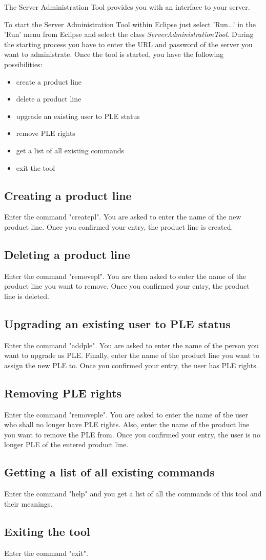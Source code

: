 The Server Administration Tool provides you with an interface to your server. \par
To start the Server Administration Tool within Eclipse just select 'Run...' in the
'Run' menu from Eclipse and select the class
{\it ServerAdministrationTool}.
During the starting process you have to enter the URL and password of the server 
you want to administrate. Once the tool is started, you have the following 
possibilities:

\begin{itemize}
	\item create a product line
	\item delete a product line
	\item upgrade an existing user to PLE status
	\item remove PLE rights
	\item get a list of all existing commands
	\item exit the tool
\end{itemize}

\subsection{Creating a product line}
Enter the command "createpl". You are asked to enter the name of the new product
line. Once you confirmed your entry, the product line is created.

\subsection{Deleting a product line}
Enter the command "removepl". You are then asked to enter the name of the product
line you want to remove. Once you confirmed your entry, the product line is deleted.

\subsection{Upgrading an existing user to PLE status}
Enter the command "addple". You are asked to enter the name of the person you want
to upgrade as PLE. Finally, enter the name of the product line you want to assign
the new PLE to. Once you confirmed your entry, the user has PLE rights.

\subsection{Removing PLE rights}
Enter the command "removeple". You are asked to enter the name of the user who shall 
no longer have PLE rights. Also, enter the name of the product line you want to
remove the PLE from. Once you confirmed your entry, the user is no longer PLE of
the entered product line.

\subsection{Getting a list of all existing commands}
Enter the command "help" and you get a list of all the commands of this tool and
their meanings.

\subsection{Exiting the tool}
Enter the command "exit".